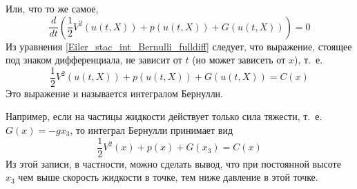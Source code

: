 Или, что то же самое,
\begin{equation*} \label{Eiler_stac_int_Bernulli_fulldiff}
	\frac{d}{dt}\left(\frac{1}{2} V^2(u(t,X)) + p(u(t,X)) + G (u(t,X))\right) = 0
\end{equation*}
Из уравнения \eqref{Eiler_stac_int_Bernulli_fulldiff} следует, что выражение,
стоящее под знаком дифференциала, не зависит от $t$ (но может зависеть от $x$), т.~е.
\begin{equation*} \label{int_Bernulli}
	\frac{1}{2} V^2(u(t,X)) + p(u(t,X)) + G (u(t,X)) = C(x)
\end{equation*}
Это выражение и называется интегралом Бернулли.

Например, если на частицы жидкости действует только сила тяжести,
т.~е. $G(x) = -gx_3$, то интеграл Бернулли принимает вид
\begin{equation*} \label{int_Bernulli}
	\frac{1}{2} V^2(x) + p(x) + G (x_3) = C(x)
\end{equation*}
Из этой записи, в частности, можно сделать вывод,
что при постоянной высоте $x_3$ чем выше скорость жидкости в точке,
тем ниже давление в этой точке.
